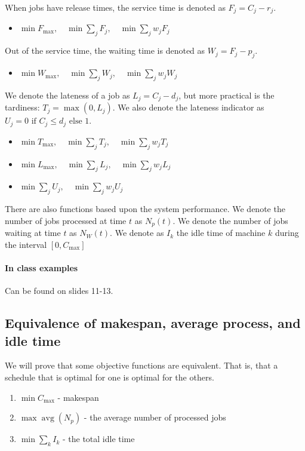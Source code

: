 \documentclass{idc_msc}
\DeclareMathOperator*{\avg}{avg}
\begin{document}
When jobs have release times, the service time is denoted as \(F_j = C_j - r_j\).

\begin{itemize}
  \item \(\min F_{\max} ,\quad \min \sum_j F_j ,\quad \min \sum_j w_j F_j\)
\end{itemize}

Out of the service time, the waiting time is denoted as \(W_j = F_j - p_j\).

\begin{itemize}
  \item \(\min W_{\max} ,\quad \min \sum_j W_j ,\quad \min \sum_j w_j W_j\)
\end{itemize}

We denote the lateness of a job as \(L_j = C_j - d_j\), but more practical is the tardiness: \(T_j = \max(0, L_j)\).
We also denote the lateness indicator as \(U_j = 0 \text{ if } C_j \le d_j \text{ else } 1\).

\begin{itemize}
  \item \(\min T_{\max} ,\quad \min \sum_j T_j ,\quad \min \sum_j w_j T_j\)
  \item \(\min L_{\max} ,\quad \min \sum_j L_j ,\quad \min \sum_j w_j L_j\)
  \item \(\min \sum_j U_j ,\quad \min \sum_j w_j U_j\)
\end{itemize}

There are also functions based upon the system performance.
We denote the number of jobs processed at time \(t\) as \(N_p(t)\).
We denote the number of jobs waiting at time \(t\) as \(N_W(t)\).
We denote as \(I_k\) the idle time of machine \(k\) during the interval \([0, C_{\max}]\)

\paragraph{In class examples}

Can be found on slides 11-13.

\subsection{Equivalence of makespan, average process, and idle time}

We will prove that some objective functions are equivalent.
That is, that a schedule that is optimal for one is optimal for the others.

\begin{enumerate}
  \item \(\min C_{\max}\) - makespan
  \item \(\max \avg(N_p)\) - the average number of processed jobs
  \item \(\min \sum_k I_k\) - the total idle time
\end{enumerate}
\end{document}
